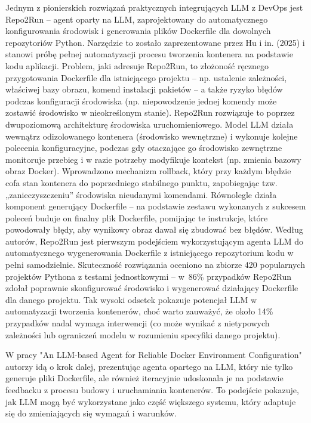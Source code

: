 Jednym z pionierskich rozwiązań praktycznych integrujących LLM z DevOps jest Repo2Run – agent oparty na LLM, zaprojektowany do automatycznego konfigurowania środowisk i generowania plików Dockerfile dla dowolnych repozytoriów Python. Narzędzie to zostało zaprezentowane przez Hu i in. (2025) i stanowi próbę pełnej automatyzacji procesu tworzenia kontenera na podstawie kodu aplikacji. Problem, jaki adresuje Repo2Run, to złożoność ręcznego przygotowania Dockerfile dla istniejącego projektu – np. ustalenie zależności, właściwej bazy obrazu, komend instalacji pakietów – a także ryzyko błędów podczas konfiguracji środowiska (np. niepowodzenie jednej komendy może zostawić środowisko w nieokreślonym stanie). Repo2Run rozwiązuje to poprzez dwupoziomową architekturę środowiska uruchomieniowego. Model LLM działa wewnątrz odizolowanego kontenera (środowisko wewnętrzne) i wykonuje kolejne polecenia konfiguracyjne, podczas gdy otaczające go środowisko zewnętrzne monitoruje przebieg i w razie potrzeby modyfikuje kontekst (np. zmienia bazowy obraz Docker). Wprowadzono mechanizm rollback, który przy każdym błędzie cofa stan kontenera do poprzedniego stabilnego punktu, zapobiegając tzw. „zanieczyszczeniu” środowiska nieudanymi komendami. Równolegle działa komponent generujący Dockerfile – na podstawie zestawu wykonanych z sukcesem poleceń buduje on finalny plik Dockerfile, pomijając te instrukcje, które powodowały błędy, aby wynikowy obraz dawał się zbudować bez błędów. Według autorów, Repo2Run jest pierwszym podejściem wykorzystującym agenta LLM do automatycznego wygenerowania Dockerfile z istniejącego repozytorium kodu w pełni samodzielnie. Skuteczność rozwiązania oceniono na zbiorze 420 popularnych projektów Pythona z testami jednostkowymi – w 86\% przypadków Repo2Run zdołał poprawnie skonfigurować środowisko i wygenerować działający Dockerfile dla danego projektu. Tak wysoki odsetek pokazuje potencjał LLM w automatyzacji tworzenia kontenerów, choć warto zauważyć, że około 14\% przypadków nadal wymaga interwencji (co może wynikać z nietypowych zależności lub ograniczeń modelu w rozumieniu specyfiki danego projektu).

W pracy "An LLM-based Agent for Reliable Docker Environment Configuration" autorzy idą o krok dalej, prezentując agenta opartego na LLM, który nie tylko generuje pliki Dockerfile, ale również iteracyjnie udoskonala je na podstawie feedbacku z procesu budowy i uruchamiania kontenerów. To podejście pokazuje, jak LLM mogą być wykorzystane jako część większego systemu, który adaptuje się do zmieniających się wymagań i warunków.

